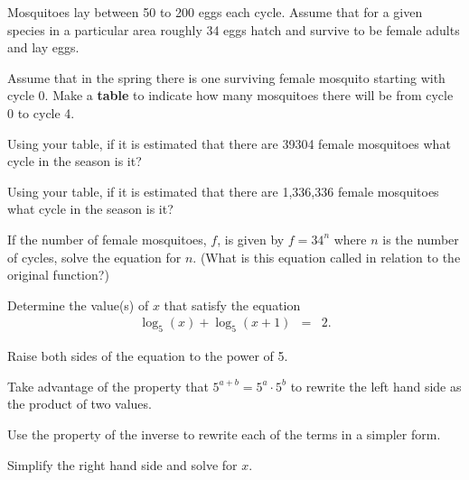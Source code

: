\begin{problem}
\clearpage

\item Mosquitoes lay between 50 to 200 eggs each cycle. Assume that
  for a given species in a particular area roughly 34 eggs hatch and
  survive to be female adults and lay eggs.
  \begin{subproblem}
  \item Assume that in the spring there is one surviving female
    mosquito starting with cycle 0. Make a \textbf{table} to indicate
    how many mosquitoes there will be from cycle 0 to cycle 4.

    \vfill
    
  \item Using your table, if it is estimated that there are 39304 female
    mosquitoes what cycle in the season is it?
    
    \vfill
    
  \item Using your table, if it is estimated that there are 1,336,336 female
    mosquitoes what cycle in the season is it?
    
    \vfill
    
  \item If the number of female mosquitoes, $f$, is given by $f=34^n$ where
    $n$ is the number of cycles, solve the equation for $n$. (What is
    this equation called in relation to the original function?)
    \vspace{3em}
  \end{subproblem}

\clearpage

\item Determine the value(s) of $x$ that satisfy the equation
  \begin{eqnarray*}
    \log_5(x) + \log_5(x+1) & = & 2.
  \end{eqnarray*}

  \begin{subproblem}
  \item Raise both sides of the equation to the power of 5. 
    \vfill
  \item Take advantage of the property that $5^{a+b}=5^a\cdot 5^b$ to
    rewrite the left hand side as the product of two values.
    \vfill
  \item Use the property of the inverse to rewrite each of the terms
    in a simpler form.
    \vfill
  \item Simplify the right hand side and solve for $x$.
    \vfill
  \end{subproblem}

\end{problem}

